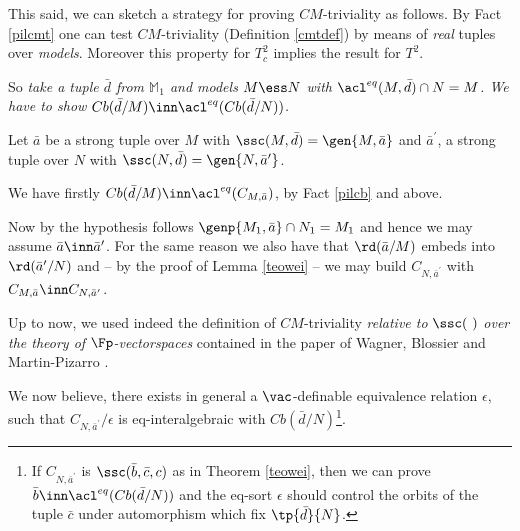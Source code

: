 %
%
\smallskip
This said, we can sketch a strategy for proving $CM$-triviality as follows.
By Fact \ref{pilcmt} one can test $CM$-triviality (Definition \ref{cmtdef}) by means of {\em real} tuples over {\em models}. Moreover
this property for $T^{2}_{c}$ implies the result for $T^{2}$.

\smallskip
So {\em take a tuple $\bar d$ from $\mathbb{M}_{1}$ and models $M\ess N$ with $\acl^{eq}(M,\bar d)\cap N=M$.
We have to show $Cb(\bar d/M)\inn\acl^{eq}(Cb(\bar d/N))$.}

\smallskip
Let $\bar a$ be a strong tuple over $M$ with $\ssc(M,\bar d)=\gen{M,\bar a}$ and $\bar a^{\prime}$, a strong tuple
over $N$ with $\ssc(N,\bar d)=\gen{N,\bar a^{\prime}}$.

We have firstly $Cb(\bar d/M)\inn\acl^{eq}(C_{M,\bar a})$, by Fact \ref{pilcb} and  above.

Now by the hypothesis follows $\genp{M_{1},\bar a}\cap N_{1}=M_{1}$ and hence we may assume $\bar a\inn\bar a^{\prime}$.
For the same reason we also have that $\rd(\bar a/M)$ embeds into $\rd(\bar a^{\prime}/N)$ and
-- by the proof of Lemma \ref{teowei} --
we may build $C_{N,\bar a^{\prime}}$ with $C_{M,\bar a}\inn C_{N,\bar a^{\prime}}$.

Up to now, we used indeed the definition of $CM$-triviality {\em relative to} $\ssc(~)$ {\em over the theory of
$\Fp$-vectorspaces}
contained in the paper of Wagner, Blossier and Martin-Pizarro \cite{cmtr}.

We now believe, there exists in general a
$\vac$-definable equivalence relation  $\epsilon$,
such that $C_{N,\bar a^{\prime}}/\epsilon$ is eq-interalgebraic with $Cb(\bar d/N)$\footnote{If $C_{N,\bar a^{\prime}}$ is
$\ssc(\bar b,\bar c,c)$ as in Theorem \ref{teowei},
then we can prove $\bar b\inn\acl^{eq}(Cb(\bar d/N))$ and the eq-sort $\epsilon$ should control the
orbits of the tuple $\bar c$ under automorphism which fix $\tp{\bar d}{N}$.}.


